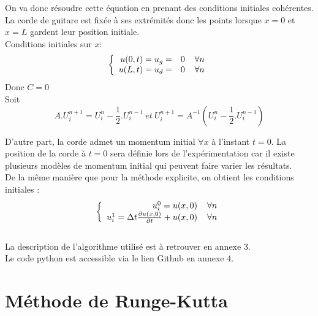 On va donc résoudre cette équation en prenant des conditions initiales cohérentes.\\
La corde de guitare est fixée à ses extrémités donc les points lorsque $x = 0$ et $x = L$ gardent leur position initiale.\\
Conditions initiales sur $x$: 
\begin{equation*}
\left \{
\begin{array}{rcl}
u(0,t) = u_{g} = &0 \hspace*{4 mm} \forall n\\
u(L,t) = u_{d} = &0 \hspace*{4 mm} \forall n\\
\end{array}
\right.
\end{equation*}
Donc $C = 0$\\
Soit
\begin{equation*}
\boxed{
A.U^{n+1}_i = U^{n}_i - \frac{1}{2}.U^{n-1}_i\:
et\:
U^{n+1}_i = A^{-1}(U^{n}_i - \frac{1}{2}.U^{n-1}_i)}
\end{equation*}



D'autre part, la corde admet un momentum initial $\forall x$ à l'instant $t=0$. La position de la corde à $t = 0$ sera définie lors de l'expérimentation car il existe plusieurs modèles de momentum initial qui peuvent faire varier les résultats.\\

De la même manière que pour la méthode explicite, on obtient les conditions initiales :
\begin{equation*}
\left \{
\begin{array}{rcl}
u^0_i = u(x,0) \hspace*{4 mm} \forall n\\
u^1_i = \Delta t \frac{\partial u(x,0)}{\partial t} + u(x,0) \hspace*{4 mm} \forall n\\
\end{array}
\right.
\end{equation*}
\\
La description de l'algorithme utilisé est à retrouver en annexe 3.\\ Le code python est accessible via le lien Github en annexe 4.

\section{Méthode de Runge-Kutta}

